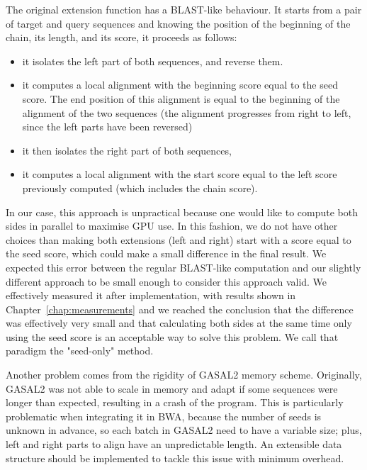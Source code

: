The original extension function has a BLAST-like behaviour. It starts from a pair of target and query sequences and knowing the position of the beginning of the chain, its length, and its score, it proceeds as follows:
\begin{itemize}
	\item it isolates the left part of both sequences, and reverse them.
	\item it computes a local alignment with the beginning score equal to the seed score. The end position of this alignment is equal to the beginning of the alignment of the two sequences (the alignment progresses from right to left, since the left parts have been reversed)
	\item it then isolates the right part of both sequences,
	\item it computes a local alignment with the start score equal to the left score previously computed (which includes the chain score).
\end{itemize}

In our case, this approach is unpractical because one would like to compute both sides in parallel to maximise GPU use. In this fashion, we do not have other choices than making both extensions (left and right) start with a score equal to the seed score, which could make a small difference in the final result. We expected this error between the regular BLAST-like computation and our slightly different approach to be small enough to consider this approach valid. We effectively measured it after implementation, with results shown in Chapter~\ref{chap:measurements} and we reached the conclusion that the difference was effectively very small and that calculating both sides at the same time only using the seed score is an acceptable way to solve this problem. We call that paradigm the "seed-only" method.

Another problem comes from the rigidity of GASAL2 memory scheme. Originally, GASAL2 was not able to scale in memory and adapt if some sequences were longer than expected, resulting in a crash of the program. This is particularly problematic when integrating it in BWA, because the number of seeds is unknown in advance, so each batch in GASAL2 need to have a variable size; plus, left and right parts to align have an unpredictable length. 
An extensible data structure should be implemented to tackle this issue with minimum overhead.


